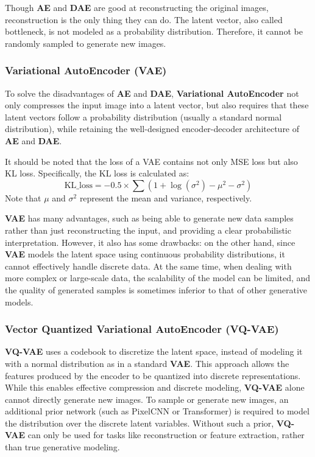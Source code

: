 \documentclass{article}
\begin{document}
Though \textbf{AE} and \textbf{DAE} are good at reconstructing the original images, reconstruction is the 
only thing they can do. The latent vector, also called bottleneck, is not modeled as a probability 
distribution. Therefore, it cannot be randomly sampled to generate new images.

\subsubsection{Variational AutoEncoder (VAE)}

To solve the disadvantages of \textbf{AE} and \textbf{DAE}, \textbf{Variational AutoEncoder} not only 
compresses the input image into a latent vector, but also requires that these latent vectors follow a 
probability distribution (usually a standard normal distribution), while retaining the well-designed 
encoder-decoder architecture of \textbf{AE} and \textbf{DAE}.

It should be noted that the loss of a VAE contains not only MSE loss but also KL loss. Specifically, the KL 
loss is calculated as:
\begin{equation}
\text{KL\_loss} = -0.5 \times \sum \left(1 + \log(\sigma^2) - \mu^2 - \sigma^2\right)
\end{equation}
Note that $\mu$ and $\sigma^2$ represent the mean and variance, respectively.


\textbf{VAE} has many advantages, such as being able to generate new data samples rather than just 
reconstructing the input, and providing a clear probabilistic interpretation. However, it also has some 
drawbacks: on the other hand, since \textbf{VAE} models the latent space using continuous probability 
distributions, it cannot effectively handle discrete data. At the same time, when dealing with more complex 
or large-scale data, the scalability of the model can be limited, and the quality of generated samples is 
sometimes inferior to that of other generative models.

\subsubsection{Vector Quantized Variational AutoEncoder (VQ-VAE)}

\textbf{VQ-VAE} uses a codebook to discretize the latent space, instead of modeling it with a normal 
distribution as in a standard \textbf{VAE}. This approach allows the features produced by the encoder to be 
quantized into discrete representations. While this enables effective compression and discrete modeling, 
\textbf{VQ-VAE} alone cannot directly generate new images. To sample or generate new images, an additional 
prior network (such as PixelCNN or Transformer) is required to model the distribution over the discrete 
latent variables. Without such a prior, \textbf{VQ-VAE} can only be used for tasks like reconstruction or 
feature extraction, rather than true generative modeling.
\end{document}
